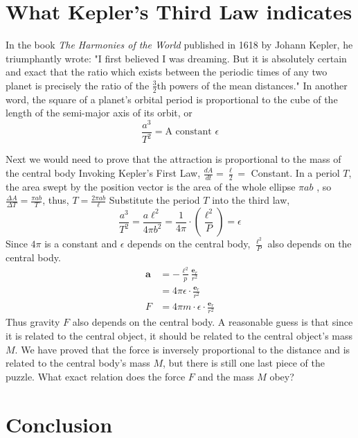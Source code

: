 \documentclass{article}
\begin{document}
\section{What Kepler's Third Law indicates}

In the book \textit{The Harmonies of the World}\autocite{kepler1619} published in 1618 by Johann Kepler, he triumphantly wrote: "I first believed I was dreaming. But it is absolutely certain and exact that the ratio which exists between the periodic times of any two planet is precisely the ratio of the $\frac{3}{2}$th powers of the mean distances."  In another word, the square of a planet's orbital period is proportional to the cube of the length of the semi-major axis of its orbit, or
\begin{equation*}
    \frac{a^3}{T^2} = \text{A constant } \epsilon
\end{equation*}

Next we would need to prove that the attraction is proportional to the mass of the central body
Invoking Kepler's First Law, $\frac{dA}{dt} = \frac{\ell}{2} = $ Constant. In a periol $T$, the area swept by the position vector is the area of the whole ellipse $\pi ab$ , so $\frac{\Delta A}{\Delta T} = \frac{\pi ab}{T}$, thus, $T = \frac{2\pi ab}{\ell}$
Substitute the period $T$ into the third law,
\begin{equation*}
    \frac{a^3}{T^2} = \frac{a\ell^2}{4\pi b^2} = \frac{1}{4\pi} \cdot (\frac{\ell^2}{P}) = \epsilon
\end{equation*}
Since $4\pi$ is a constant and $\epsilon$ depends on the central body, $\frac{\ell^2}{P}$ also depends on the central body.
\begin{align*}
    \boldsymbol{a} & =  - \frac{\ell ^ 2}{p} \frac{\boldsymbol{e}_{r}}{r ^ 2}
    \\ & = 4\pi \epsilon \cdot \frac{\boldsymbol{e}_{r}}{r ^ 2}
    \\ F & = 4\pi m \cdot \epsilon \cdot \frac{\boldsymbol{e}_{r}}{r ^ 2}
\end{align*}
Thus gravity $F$ also depends on the central body. A reasonable guess is that since it is related to the central object, it should be related to the central object's mass $M$.  We have proved that the force is inversely proportional to the distance and is related to the central body's mass $M$, but there is still one last piece of the puzzle. What exact relation does the force $F$ and the mass $M$ obey?

\section{Conclusion}
\end{document}
